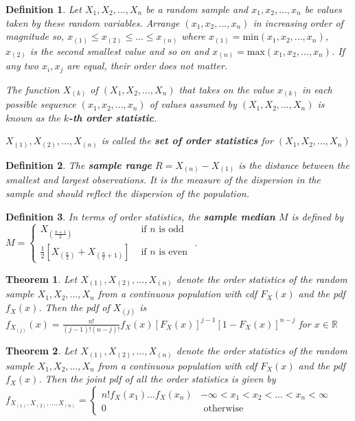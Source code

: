 \documentclass[14pt,twoside]{extreport}
\theoremstyle{dotless}
\newtheorem*{defn}{Definition}
\newtheorem*{thm}{Theorem} %
\begin{document}
\begin{defn}
    Let $X_1, X_2, ..., X_n$ be a random sample and $x_1, x_2, ..., x_n$ be values taken by these random variables.
    Arrange $(x_1, x_2, ..., x_n)$ in increasing order of magnitude so, $x_{(1)} \leq x_{(2)} \leq ... \leq x_{(n)}$
    where $x_{(1)} = \text{min}(x_1, x_2, ..., x_n)$, $x_{(2)}$ is the second smallest value and so on and $x_{(n)} = \text{max}(x_1, x_2, ..., x_n)$. If any two $x_i, x_j$ are equal, their order does not matter.

    
    The function $X_{(k)}$ of $(X_1, X_2, ..., X_n)$ that takes on the value $x_{(k)}$ in each possible sequence $(x_1, x_2, ... , x_n)$ of values assumed by $(X_1, X_2, ..., X_n)$ is known as the \textbf{$k$-th order statistic}. 

    ${X_{(1)}, X_{(2)}, ..., X_{(n)}}$ is called the \textbf{set of order statistics} for $(X_1, X_2, ..., X_n)$
\end{defn}

\begin{defn}
    The \textbf{sample range} $R = X_{(n)} - X_{(1)}$ is the distance between the smallest and largest observations. It is the measure of the dispersion in the sample and should reflect the dispersion of the population.
\end{defn}

\begin{defn}
    In terms of order statistics, the \textbf{sample median} $M$ is defined by \\ 
    $M = \begin{cases} X_{(\frac{n+1}{2})} & \text{ if } n \text{ is odd } \\ \frac{1}{2} \left[ X_{(\frac{n}{2})} + X_{(\frac{n}{2} + 1)}\right] & \text{ if } n \text{ is even } \end{cases}$.
\end{defn}

\begin{thm}
    Let $X_{(1)}, X_{(2)}, ..., X_{(n)}$ denote the order statistics of the random sample $X_1, X_2, ..., X_n$ from a continuous population with cdf $F_X(x)$ and the pdf $f_X(x)$.
    Then the pdf of $X_{(j)}$ is 
    \\$f_{X_{(j)}}(x)= \displaystyle \frac{n!}{(j-1)! (n-j)!} f_X(x) [F_X(x)]^{j-1} [1-F_X(x)]^{n-j}$ for $x \in \mathbb{R}$
\end{thm}

\begin{thm}
    Let $X_{(1)}, X_{(2)}, ..., X_{(n)}$ denote the order statistics of the random sample $X_1, X_2, ..., X_n$ from a continuous population with cdf $F_X(x)$ and the pdf $f_X(x)$. Then the joint pdf of all the order statistics is given by
    \\$ f_{X_{(1)}, X_{(2)}, ..., X_{(n)}} = \begin{cases} n! f_X(x_1) ... f_X(x_n) & -\infty < x_1 < x_2 < ... < x_n < \infty \\ 0 & \text{ otherwise }\end{cases}$
\end{thm}
\end{document}
